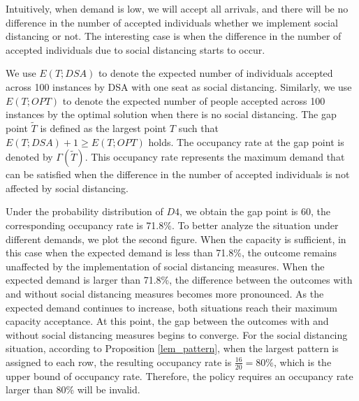 Intuitively, when demand is low, we will accept all arrivals, and there will be no difference in the number of accepted individuals whether we implement social distancing or not. The interesting case is when the difference in the number of accepted individuals due to social distancing starts to occur.

We use $E(T; DSA)$ to denote the expected number of individuals accepted across 100 instances by DSA with one seat as social distancing. Similarly, we use $E(T; OPT)$ to denote the expected number of people accepted across 100 instances by the optimal solution when there is no social distancing. The gap point $\tilde{T}$ is defined as the largest point $T$ such that $E(T; DSA)+1 \geq E(T; OPT)$ holds. The occupancy rate at the gap point is denoted by $\Gamma(\tilde{T})$. This occupancy rate represents the maximum demand that can be satisfied when the difference in the number of accepted individuals is not affected by social distancing.


Under the probability distribution of $D4$, we obtain the gap point is 60, the corresponding occupancy rate is 71.8\%. To better analyze the situation under different demands, we plot the second figure. When the capacity is sufficient, in this case when the expected demand is less than 71.8\%, the outcome remains unaffected by the implementation of social distancing measures. When the expected demand is larger than 71.8\%, the difference between the outcomes with and without social distancing measures becomes more pronounced. As the expected demand continues to increase, both situations reach their maximum capacity acceptance. At this point, the gap between the outcomes with and without social distancing measures begins to converge. For the social distancing situation, according to Proposition \ref{lem_pattern}, when the largest pattern is assigned to each row, the resulting occupancy rate is $\frac{16}{20} = 80\%$, which is the upper bound of occupancy rate. Therefore, the policy requires an occupancy rate larger than 80\% will be invalid.


